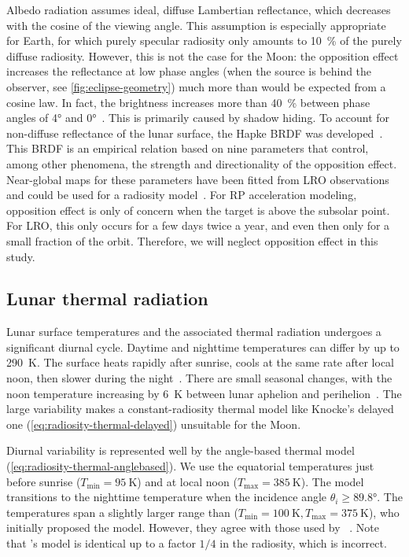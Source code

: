 Albedo radiation assumes ideal, diffuse Lambertian reflectance, which decreases with the cosine of the viewing angle. This assumption is especially appropriate for Earth, for which purely specular radiosity only amounts to \qty{10}{\percent} of the purely diffuse radiosity. However, this is not the case for the Moon: the opposition effect increases the reflectance at low phase angles (when the source is behind the observer, see \cref{fig:eclipse-geometry}) much more than would be expected from a cosine law. In fact, the brightness increases more than \qty{40}{\percent} between phase angles of \ang{4} and \ang{0}~\cite{Buratti1996}. This is primarily caused by shadow hiding. To account for non-diffuse reflectance of the lunar surface, the Hapke \gls{BRDF} was developed~\cite{Hapke2012}. This \gls{BRDF} is an empirical relation based on nine parameters that control, among other phenomena, the strength and directionality of the opposition effect. Near-global maps for these parameters have been fitted from \gls{LRO} observations and could be used for a radiosity model~\cite{Sato2014}. For \gls{RP} acceleration modeling, opposition effect is only of concern when the target is above the subsolar point. For \gls{LRO}, this only occurs for a few days twice a year, and even then only for a small fraction of the orbit. Therefore, we will neglect opposition effect in this study.




\subsection{Lunar thermal radiation}

Lunar surface temperatures and the associated thermal radiation undergoes a significant diurnal cycle. Daytime and nighttime temperatures can differ by up to \qty{290}{\K}. The surface heats rapidly after sunrise, cools at the same rate after local noon, then slower during the night~\cite{Vasavada2012}. There are small seasonal changes, with the noon temperature increasing by \qty{6}{\K} between lunar aphelion and perihelion~\cite{Heiken1991}. The large variability makes a constant-radiosity thermal model like Knocke's delayed one (\cref{eq:radiosity-thermal-delayed}) unsuitable for the Moon.

Diurnal variability is represented well by the angle-based thermal model (\cref{eq:radiosity-thermal-anglebased}). We use the equatorial temperatures just before sunrise ($T_\text{min} = \qty{95}{\K}$) and at local noon ($T_\text{max} = \qty{385}{\K}$). The model transitions to the nighttime temperature when the incidence angle $\theta_i \geq \ang{89.8}$. The temperatures span a slightly larger range than \citeauthor{Lemoine2013} ($T_\text{min} = \qty{100}{\K}, T_\text{max} = \qty{375}{\K}$), who initially proposed the model. However, they agree with those used by \citeauthor{Park2011}~\cite{Park2011}. Note that \citeauthor{Park2011}'s model is identical up to a factor $1/4$ in the radiosity, which is incorrect.

